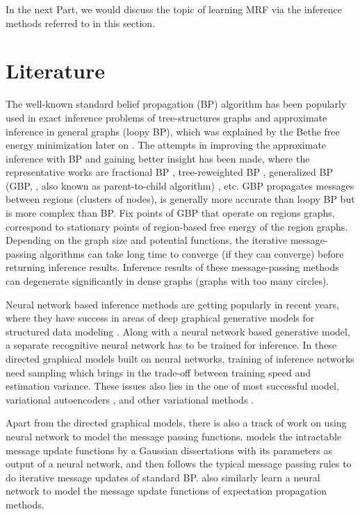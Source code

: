 In the next Part, we would discuss the topic of learning MRF via the inference methods referred to in this section.

\section{Literature}

The well-known standard belief propagation (BP) algorithm \cite{Pearl1982reverend,kschischang2001factor_graph} has been popularly used in exact inference problems of tree-structures graphs and approximate inference in general graphs (loopy BP), which was explained by the Bethe free energy minimization later on \cite{yedidia2003understanding}. The attempts in improving the approximate inference with BP and gaining better insight has been made, where the representative works are fractional BP \cite{Wiegerinck:2002:FBP:2968618.2968673}, tree-reweighted BP \cite{wainwright2008graphical}, generalized BP (GBP, , also known as parent-to-child algorithm) \cite{Yedidia:2000:GBP:3008751.3008848, yedida2005constucting}, etc. 
GBP propagates messages between regions (clusters of nodes), is generally more accurate than loopy BP but is more complex than BP. Fix points of GBP that operate on regions graphs, correspond to stationary points of region-based free energy of the region graphs. Depending on the graph size and potential functions, the iterative message-passing algorithms can take long time to converge (if they can converge) before returning inference results. Inference results of these message-passing methods can degenerate significantly in dense graphs (graphs with too many circles).

Neural network based inference methods are getting popularly in recent years, where they have success in areas of deep graphical generative models for structured data modeling \cite{qu2019gmnn, johansonNIPS2016_6379, li2018graphical}. Along with a neural network based generative model, a separate recognitive neural network has to be trained for inference. In these directed graphical models built on neural networks, training of inference networks need sampling which brings in the trade-off between training speed and estimation variance. These issues also lies in the one of most successful model, variational autoencoders \cite{DBLP:journals/corr/KingmaW13,2017arXiv170104722M, 2017arXiv171101558T}, and other variational methods \cite{kuleshov2017neural_variational,NIPS2017_7136}.

Apart from the directed graphical models, there is also a track of work on using neural network to model the message passing functions. \cite{akbayrak2019reparameterization} models the intractable message update functions by a Gaussian dissertations with its parameters as output of a neural network, and then follows the typical message passing rules to do iterative message updates of standard BP. \cite{jitkrittum2015kernel, heess2013learning} also similarly learn a neural network to model the message update functions of expectation propagation methods.


